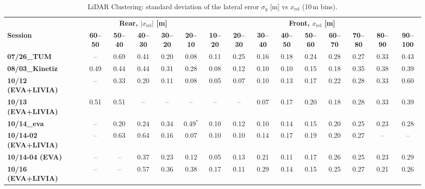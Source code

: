 \begin{landscape}
\begin{table}[H]
\centering
\setlength{\tabcolsep}{2.6pt}\small\renewcommand{\arraystretch}{0.85}
\begin{tabular}{|lccccc|ccccccccc|}
\hline
 \rowcolor{bluepoli!40} &\multicolumn{5}{c|}{\textbf{Rear, $|x_{\mathrm{rel}}|$ [m]}}&\multicolumn{9}{c|}{\textbf{Front, $x_{\mathrm{rel}}$ [m]}} \\
\rowcolor{bluepoli!40} \textbf{Session} & \textbf{60--50} & \textbf{50--40} & \textbf{40--30} & \textbf{30--20} & \textbf{20--10} & \textbf{10--20} & \textbf{20--30} & \textbf{30--40} & \textbf{40--50} & \textbf{50--60} & \textbf{60--70} & \textbf{70--80} & \textbf{80--90} & \textbf{90--100} \\
\hline\hline
\textbf{07/26\_TUM} & -- & 0.69 & 0.41 & 0.20 & 0.08 & 0.11 & 0.25 & 0.16 & 0.18 & 0.24 & 0.28 & 0.27 & 0.33 & 0.43 \\
\textbf{08/03\_Kinetiz} & 0.49 & 0.44 & 0.44 & 0.31 & 0.28 & 0.08 & 0.12 & 0.10 & 0.10 & 0.15 & 0.18 & 0.35 & 0.38 & 0.39 \\
\textbf{10/12 (EVA+LIVIA)} & -- & 0.33 & 0.20 & 0.11 & 0.08 & 0.05 & 0.07 & 0.10 & 0.13 & 0.17 & 0.22 & 0.28 & 0.33 & 0.60 \\
\textbf{10/13 (EVA+LIVIA)} & 0.51 & 0.51 & -- & -- & -- & -- & -- & 0.07 & 0.17 & 0.20 & 0.18 & 0.28 & 0.33 & 0.39 \\
\textbf{10/14\_eva} & -- & 0.20 & 0.24 & 0.34 & 0.49$^{*}$ & 0.10 & 0.12 & 0.10 & 0.14 & 0.15 & 0.20 & 0.25 & 0.23 & 0.28 \\
\textbf{10/14-02 (EVA+LIVIA)} & -- & 0.63 & 0.64 & 0.16 & 0.07 & 0.10 & 0.10 & 0.14 & 0.17 & 0.19 & 0.20 & 0.27 & -- & -- \\
\textbf{10/14-04 (EVA)} & -- & -- & 0.37 & 0.23 & 0.12 & 0.05 & 0.13 & 0.21 & 0.11 & 0.17 & 0.26 & 0.25 & 0.23 & 0.29 \\
\textbf{10/16 (EVA+LIVIA)} & -- & -- & 0.57 & 0.36 & 0.38 & 0.17 & 0.11 & 0.29 & 0.14 & 0.15 & 0.25 & 0.27 & 0.21 & 0.26 \\
\hline
\end{tabular}
\par{}
\caption{LiDAR Clustering: standard deviation of the lateral error $\sigma_y$ [m] vs $x_{\mathrm{rel}}$ (10\,m bins).}
\label{tab:clust_sy}
\end{table}
\end{landscape}

